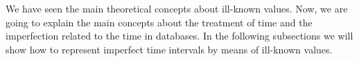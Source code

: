 %

We have seen the main theoretical concepts about ill-known values. Now, we are going to explain the main concepts about the treatment of time and the imperfection related to the time in databases. In the following subsections we will show how to represent imperfect time intervals by means of ill-known values.


